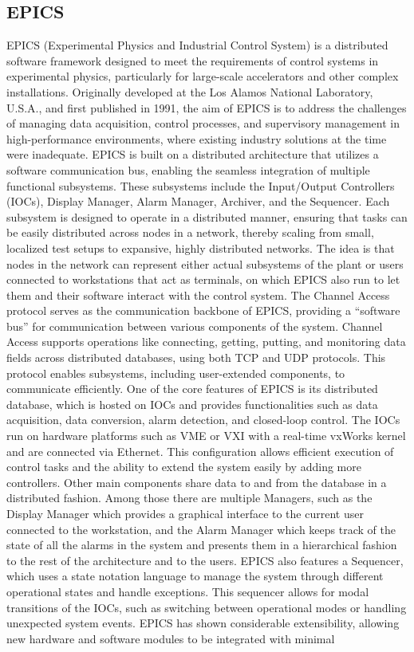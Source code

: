 \subsection{EPICS}
\label{sec:related_work_epics}
EPICS (Experimental Physics and Industrial Control System) \cite{dalesio_epics_1991,epics_controls_epics_nodate} is a distributed software framework designed to meet the requirements of control systems in experimental physics, particularly for large-scale accelerators and other complex installations. Originally developed at the Los Alamos National Laboratory, U.S.A., and first published in 1991, the aim of EPICS is to address the challenges of managing data acquisition, control processes, and supervisory management in high-performance environments, where existing industry solutions at the time were inadequate. EPICS is built on a distributed architecture that utilizes a software communication bus, enabling the seamless integration of multiple functional subsystems. These subsystems include the Input/Output Controllers (IOCs), Display Manager, Alarm Manager, Archiver, and the Sequencer. Each subsystem is designed to operate in a distributed manner, ensuring that tasks can be easily distributed across nodes in a network, thereby scaling from small, localized test setups to expansive, highly distributed networks. The idea is that nodes in the network can represent either actual subsystems of the plant or users connected to workstations that act as terminals, on which EPICS also run to let them and their software interact with the control system. The Channel Access protocol serves as the communication backbone of EPICS, providing a ``software bus'' for communication between various components of the system. Channel Access supports operations like connecting, getting, putting, and monitoring data fields across distributed databases, using both TCP and UDP protocols. This protocol enables subsystems, including user-extended components, to communicate efficiently. One of the core features of EPICS is its distributed database, which is hosted on IOCs and provides functionalities such as data acquisition, data conversion, alarm detection, and closed-loop control. The IOCs run on hardware platforms such as VME or VXI with a real-time vxWorks kernel and are connected via Ethernet. This configuration allows efficient execution of control tasks and the ability to extend the system easily by adding more controllers. Other main components share data to and from the database in a distributed fashion. Among those there are multiple Managers, such as the Display Manager which provides a graphical interface to the current user connected to the workstation, and the Alarm Manager which keeps track of the state of all the alarms in the system and presents them in a hierarchical fashion to the rest of the architecture and to the users. EPICS also features a Sequencer, which uses a state notation language to manage the system through different operational states and handle exceptions. This sequencer allows for modal transitions of the IOCs, such as switching between operational modes or handling unexpected system events. EPICS has shown considerable extensibility, allowing new hardware and software modules to be integrated with minimal 